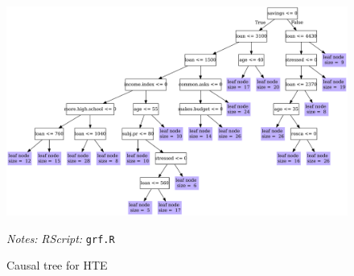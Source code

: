 \documentclass[11pt]{article}
\begin{document}
\begin{figure}[H]
        \caption{Causal tree for HTE}
    \label{casual_tree}
    \begin{center}
        \centering
        \includegraphics[width=\textwidth]{Figuras/crf_pro_2_fc_admin_disc.pdf}
    \end{center}
    \footnotesize \textit{Notes: } 
     \footnotesize{ \textit{RScript: }  \texttt{grf.R}}
\end{figure}





    
\end{document}
